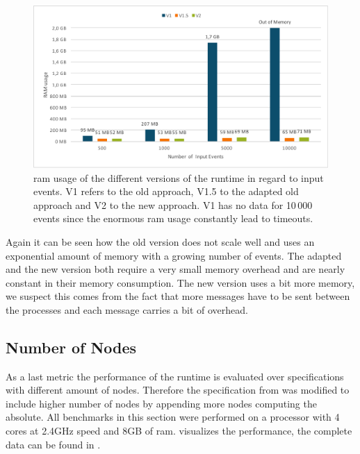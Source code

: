 \begin{figure}
  \includegraphics[width=\textwidth]{gfx/runtime_ram_usage_benchmark}
  \caption[\gls{ram} usage of the different versions of the runtime]{\gls{ram} usage of the different versions of the runtime in regard to input events. V1 refers to the old approach, V1.5 to the adapted old approach and V2 to the new approach. V1 has no data for 10\,000 events since the enormous \gls{ram} usage constantly lead to timeouts.}
\label{fig:chap_eval:runtime_ram_usage}
\end{figure}

Again it can be seen how the old version does not scale well and uses an exponential amount of memory with a growing number of events.
The adapted and the new version both require a very small memory overhead and are nearly constant in their memory consumption.
The new version uses a bit more memory, we suspect this comes from the fact that more messages have to be sent between the processes and each message carries a bit of overhead.

\subsection{Number of Nodes}

As a last metric the performance of the runtime is evaluated over specifications with different amount of nodes.
Therefore the specification from  was modified to include higher number of nodes by appending more nodes computing the absolute.
All benchmarks in this section were performed on a processor with 4 cores at 2.4GHz speed and 8GB of \gls{ram}.
 visualizes the performance, the complete data can be found in .

